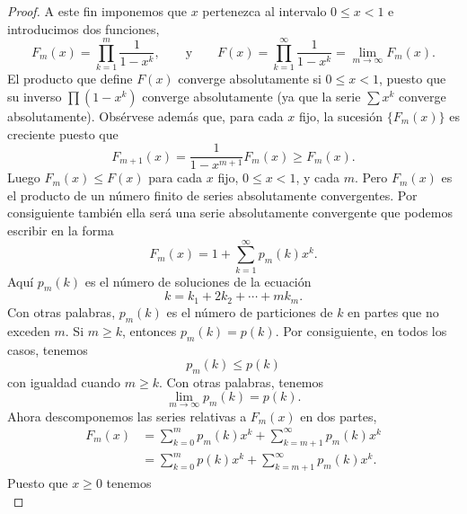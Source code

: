 \begin{proof}
        A este fin imponemos que $x$ pertenezca al intervalo $0\leq x<1$ e introducimos dos
        funciones,
        \begin{equation*}
            F_m(x)=\prod_{k=1}^{m}\frac{1}{1-x^k},\qquad\text{y}\qquad F(x)=\prod_{k=1}^{\infty}\frac{1}{1-x^k}=\lim_{m\to\infty}F_m(x).
        \end{equation*}
        El producto que define $F(x)$ converge absolutamente si $0\leq x<1$, puesto que su
        inverso $\prod(1-x^k)$ converge absolutamente (ya que la serie $\sum x^k$ converge
        absolutamente). Obsérvese además que, para cada $x$ fijo, la sucesión $\{F_m(x)\}$ es
        creciente puesto que
        \begin{equation*}
            F_{m+1}(x)=\frac{1}{1-x^{m+1}}F_m(x)\geq F_m(x).
        \end{equation*}
        Luego $F_m(x)\leq F(x)$ para cada $x$ fijo, $0\leq x<1$, y cada $m$. Pero $F_m(x)$ es
        el producto de un número finito de series absolutamente convergentes. Por consiguiente
        también ella será una serie absolutamente convergente que podemos escribir en la forma
        \begin{equation*}
            F_m(x)=1+\sum_{k=1}^{\infty}p_m(k)x^k.
        \end{equation*}
        Aquí $p_m(k)$ es el número de soluciones de la ecuación
        \begin{equation*}
            k=k_1+2k_2+\cdots+mk_m.
        \end{equation*}
        Con otras palabras, $p_m(k)$ es el número de particiones de $k$ en partes que no exceden
        $m$. Si $m\geq k$, entonces $p_m(k)=p(k)$. Por consiguiente, en todos los casos,
        tenemos
        \begin{equation*}
            p_m(k)\leq p(k)
        \end{equation*}
        con igualdad cuando $m\geq k$. Con otras palabras, tenemos
        \begin{equation*}
            \lim_{m\to\infty}p_m(k)=p(k).
        \end{equation*}
        Ahora descomponemos las series relativas a $F_m(x)$ en dos partes,
        \begin{align*}
            F_m(x)&=\sum_{k=0}^{m}p_m(k)x^k+\sum_{k=m+1}^{\infty}p_m(k)x^k\\
            &=\sum_{k=0}^{m}p(k)x^k+\sum_{k=m+1}^{\infty}p_m(k)x^k.
        \end{align*}
        Puesto que $x\geq0$ tenemos
        \begin{equation*}

\end{equation*}
\end{proof}
